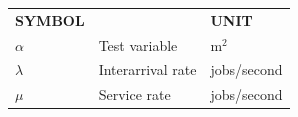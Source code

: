 \listofsymbols
\begin{flushleft}
\begin{tabular}{@{}p{}p{}p{}}
\textbf{SYMBOL}  & & \textbf{UNIT} \\[0.2cm]
$\alpha$ & Test variable\hfill & m$^2$ \\
$\lambda$ & Interarrival rate\hfill & jobs/second \\
$\mu$ & Service rate\hfill & jobs/second \\
\end{tabular}
\end{flushleft}
